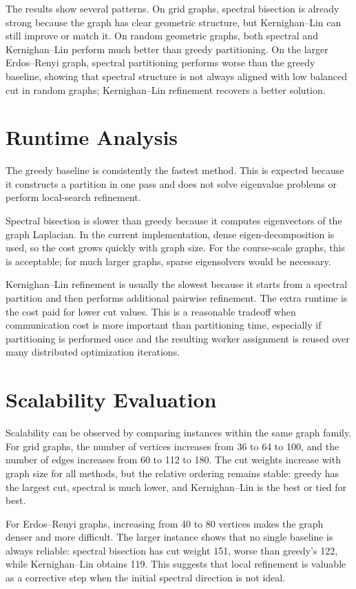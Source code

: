 \documentclass[11pt]{article}
\begin{document}
The results show several patterns. On grid graphs, spectral bisection is
already strong because the graph has clear geometric structure, but
Kernighan--Lin can still improve or match it. On random geometric graphs, both
spectral and Kernighan--Lin perform much better than greedy partitioning. On
the larger Erdos--Renyi graph, spectral partitioning performs worse than the
greedy baseline, showing that spectral structure is not always aligned with
low balanced cut in random graphs; Kernighan--Lin refinement recovers a better
solution.

\section{Runtime Analysis}

The greedy baseline is consistently the fastest method. This is expected
because it constructs a partition in one pass and does not solve eigenvalue
problems or perform local-search refinement.

Spectral bisection is slower than greedy because it computes eigenvectors of
the graph Laplacian. In the current implementation, dense eigen-decomposition
is used, so the cost grows quickly with graph size. For the course-scale
graphs, this is acceptable; for much larger graphs, sparse eigensolvers would
be necessary.

Kernighan--Lin refinement is usually the slowest because it starts from a
spectral partition and then performs additional pairwise refinement. The extra
runtime is the cost paid for lower cut values. This is a reasonable tradeoff
when communication cost is more important than partitioning time, especially if
partitioning is performed once and the resulting worker assignment is reused
over many distributed optimization iterations.

\section{Scalability Evaluation}

Scalability can be observed by comparing instances within the same graph
family. For grid graphs, the number of vertices increases from 36 to 64 to
100, and the number of edges increases from 60 to 112 to 180. The cut weights
increase with graph size for all methods, but the relative ordering remains
stable: greedy has the largest cut, spectral is much lower, and
Kernighan--Lin is the best or tied for best.

For Erdos--Renyi graphs, increasing from 40 to 80 vertices makes the graph
denser and more difficult. The larger instance shows that no single baseline
is always reliable: spectral bisection has cut weight 151, worse than greedy's
122, while Kernighan--Lin obtains 119. This suggests that local refinement is
valuable as a corrective step when the initial spectral direction is not ideal.
\end{document}
